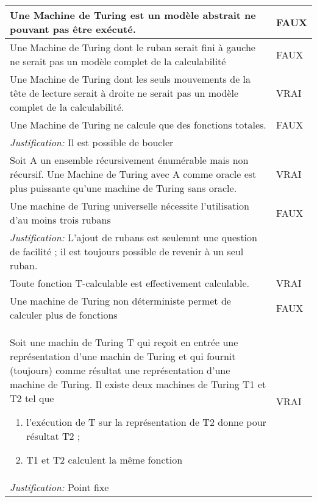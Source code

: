 \begin{tabular}{p{13cm}|l}
    Une Machine de Turing est un modèle abstrait ne pouvant pas être exécuté.& FAUX \\
     \hline
    Une Machine de Turing dont le ruban serait fini à gauche ne serait pas un modèle complet de la calculabilité & FAUX \\
     \hline
    Une Machine de Turing dont les seuls mouvements de la tête de lecture serait à droite ne serait pas un modèle complet de la calculabilité. & VRAI \\
     \hline
    Une Machine de Turing ne calcule que des fonctions totales. & FAUX \\
    \textit{Justification:} Il est possible de boucler & \\
     \hline
    Soit A un ensemble récursivement énumérable mais non récursif. Une Machine de Turing avec A comme oracle est plus puissante qu'une machine de Turing sans oracle. & VRAI \\
     \hline
    Une machine de Turing universelle nécessite l'utilisation d'au moins trois rubans & FAUX \\
    \textit{Justification:} L'ajout de rubans est seulemnt une question de facilité ; il est toujours possible de revenir à un seul ruban. & \\
     \hline
    Toute fonction T-calculable est effectivement calculable. & VRAI \\
     \hline
    Une machine de Turing non déterministe permet de calculer plus de fonctions & FAUX \\
     \hline
    Soit une machin de Turing T qui reçoit en entrée une représentation d'une machin de Turing et qui fournit (toujours) comme résultat une représentation d'une machine de Turing. Il existe deux machines de Turing T1 et T2 tel que \begin{enumerate}
    \item l'exécution de T sur la représentation de T2 donne pour résultat T2 ;
    \item T1 et T2 calculent la même fonction
   \end{enumerate}
   & VRAI \\
    \textit{Justification:} Point fixe & \\

\end{tabular}
